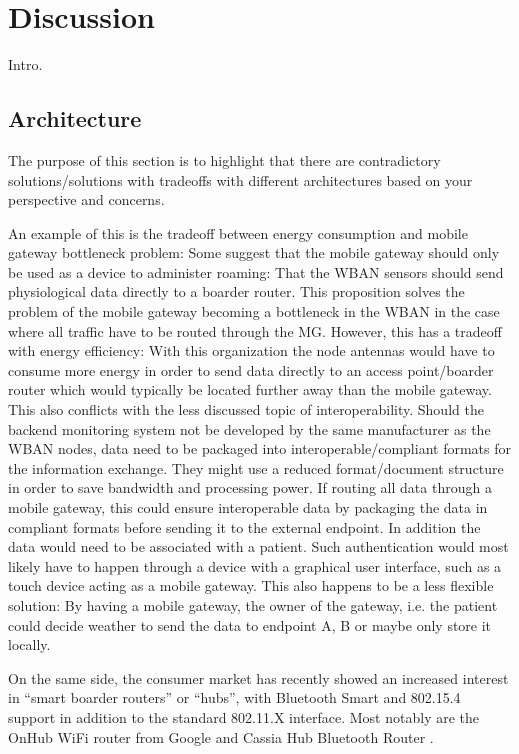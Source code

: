 \section{Discussion} %
\label{sec:discussion}

Intro.

\subsection{Architecture} %
\label{sub:architecture}

The purpose of this section is to highlight that there are contradictory solutions/solutions with tradeoffs with different architectures based on your perspective and concerns. 

An example of this is the tradeoff between energy consumption and mobile gateway bottleneck problem: Some suggest that the mobile gateway should only be used as a device to administer roaming: That the WBAN sensors should send physiological data directly to a boarder router. This proposition solves the problem of the mobile gateway becoming a bottleneck in the WBAN in the case where all traffic have to be routed through the MG. However, this has a tradeoff with energy efficiency: With this organization the node antennas would have to consume more energy in order to send data directly to an access point/boarder router which would typically be located further away than the mobile gateway. This also conflicts with the less discussed topic of interoperability. Should the backend monitoring system not be developed by the same manufacturer as the WBAN nodes, data need to be packaged into interoperable/compliant formats for the information exchange. They might use a reduced format/document structure in order to save bandwidth and processing power. If routing all data through a mobile gateway, this could ensure interoperable data by packaging the data in compliant formats before sending it to the external endpoint. In addition the data would need to be associated with a patient. Such authentication would most likely have to happen through a device with a graphical user interface, such as a touch device acting as a mobile gateway. This also happens to be a less flexible solution: By having a mobile gateway, the owner of the gateway, i.e. the patient could decide weather to send the data to endpoint A, B or maybe only store it locally.

On the same side, the consumer market has recently showed an increased interest in ``smart boarder routers'' or ``hubs'', with Bluetooth Smart and 802.15.4 support in addition to the standard 802.11.X interface. Most notably are the OnHub WiFi router from Google \cite{newRef_60} and Cassia Hub Bluetooth Router \cite{newRef_61}.

